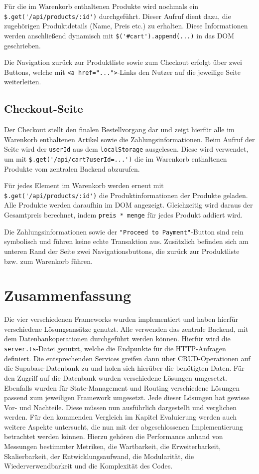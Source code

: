 \documentclass[oneside]{ausarbeitung}
\begin{document}
Für die im Warenkorb enthaltenen Produkte wird nochmals ein \verb|$.get('/api/products/:id')| durchgeführt. Dieser Aufruf dient dazu, die zugehörigen Produktdetails (Name, Preis etc.) zu erhalten. Diese Informationen werden anschließend dynamisch mit \verb|$('#cart').append(...)| in das DOM geschrieben.

Die Navigation zurück zur Produktliste sowie zum Checkout erfolgt über zwei Buttons, welche mit \texttt{<a href="...">}-Links den Nutzer auf die jeweilige Seite weiterleiten.


\subsection{Checkout-Seite}

Der Checkout stellt den finalen Bestellvorgang dar und zeigt hierfür alle im Warenkorb enthaltenen Artikel sowie die Zahlungsinformationen. Beim Aufruf der Seite wird der \texttt{userId} aus dem \texttt{localStorage} ausgelesen. Diese wird verwendet, um mit \verb|$.get('/api/cart?userId=...')| die im Warenkorb enthaltenen Produkte vom zentralen Backend abzurufen. 

Für jedes Element im Warenkorb werden erneut mit \verb|$.get('/api/products/:id')| die Produktinformationen der Produkte geladen. Alle Produkte werden daraufhin im DOM angezeigt. Gleichzeitig wird daraus der Gesamtpreis berechnet, indem \texttt{preis * menge} für jedes Produkt addiert wird. 

Die Zahlungsinformationen sowie der \texttt{"Proceed to Payment"}-Button sind rein symbolisch und führen keine echte Transaktion aus. Zusätzlich befinden sich am unteren Rand der Seite zwei Navigationsbuttons, die zurück zur Produktliste bzw. zum Warenkorb führen.

\section{Zusammenfassung}

Die vier verschiedenen Frameworks wurden implementiert und haben hierfür verschiedene Lösungsansätze genutzt. Alle verwenden das zentrale Backend, mit dem Datenbankoperationen durchgeführt werden können. Hierfür wird die \texttt{server.ts}-Datei genutzt, welche die Endpunkte für die HTTP-Anfragen definiert. Die entsprechenden Services greifen dann über CRUD-Operationen auf die Supabase-Datenbank zu und holen sich hierüber die benötigten Daten. Für den Zugriff auf die Datenbank wurden verschiedene Lösungen umgesetzt. Ebenfalls wurden für State-Management und Routing verschiedene Lösungen passend zum jeweiligen Framework umgesetzt. Jede dieser Lösungen hat gewisse Vor- und Nachteile. Diese müssen nun ausführlich dargestellt und verglichen werden. Für den kommenden Vergleich im Kapitel Evaluierung werden auch weitere Aspekte untersucht, die nun mit der abgeschlossenen Implementierung betrachtet werden können. Hierzu gehören die Performance anhand von Messungen bestimmter Metriken, die Wartbarkeit, die Erweiterbarkeit, Skalierbarkeit, der Entwicklungsaufwand, die Modularität, die Wiederverwendbarkeit und die Komplexität des Codes.
\end{document}
